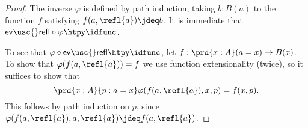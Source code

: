 \begin{proof}
The inverse $\varphi$ is defined by path induction, taking $b:B(a)$ to the function $f$ satisfying $f(a,\refl{a})\jdeq b$. It is immediate that $\mathsf{ev\usc{}refl}\circ\varphi\htpy \idfunc$.

To see that $\varphi\circ \mathsf{ev\usc{}refl}\htpy\idfunc$, let $f:\prd{x:A}(a=x)\to B(x)$. To show that $\varphi(f(a,\refl{a}))=f$ we use function extensionality (twice), so it suffices to show that
\begin{equation*}
\prd{x:A}{p:a=x} \varphi(f(a,\refl{a}),x,p)=f(x,p).
\end{equation*}
This follows by path induction on $p$, since $\varphi(f(a,\refl{a}),a,\refl{a})\jdeq f(a,\refl{a})$.
\end{proof}



